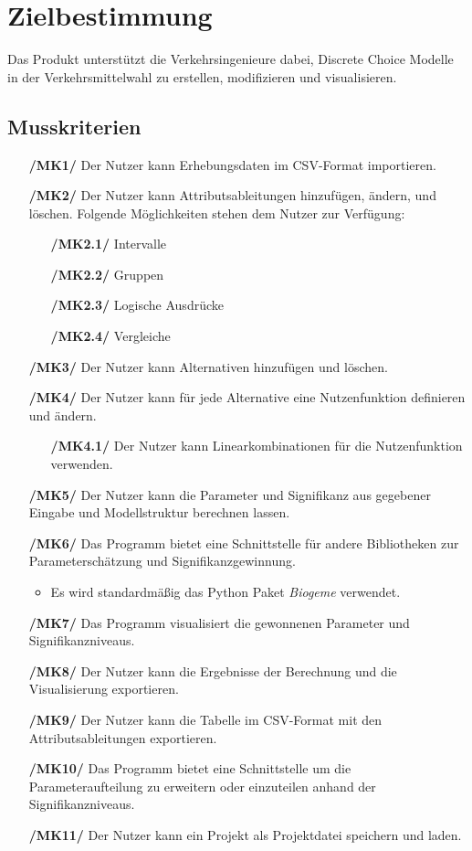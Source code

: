 \documentclass{article}
\begin{document}
\newpage
\section{Zielbestimmung}
Das Produkt unterstützt die Verkehrsingenieure dabei, Discrete Choice Modelle in der Verkehrsmittelwahl zu erstellen, modifizieren und visualisieren.
\subsection{Musskriterien}
\begin{itemize}
    \item[\textbf{/MK1/}] Der Nutzer kann Erhebungsdaten im CSV-Format importieren.
    \item[\textbf{/MK2/}] Der Nutzer kann Attributsableitungen hinzufügen, ändern, und löschen.
    \subitem Folgende Möglichkeiten stehen dem Nutzer zur Verfügung:
    \begin{itemize}[leftmargin=.7in]
        \item[\textbf{/MK2.1/}] Intervalle
        \item[\textbf{/MK2.2/}] Gruppen
        \item[\textbf{/MK2.3/}] Logische Ausdrücke
        \item[\textbf{/MK2.4/}] Vergleiche
    \end{itemize}
    \item[\textbf{/MK3/}] Der Nutzer kann Alternativen hinzufügen und löschen.
    \item[\textbf{/MK4/}] Der Nutzer kann für jede Alternative eine Nutzenfunktion definieren und ändern.
    \begin{itemize}[leftmargin=.7in]
        \item[\textbf{/MK4.1/}] Der Nutzer kann Linearkombinationen für die Nutzenfunktion verwenden.
    \end{itemize}
    \item[\textbf{/MK5/}] Der Nutzer kann die Parameter und Signifikanz aus gegebener Eingabe und Modellstruktur berechnen lassen.
    \item[\textbf{/MK6/}] Das Programm bietet eine Schnittstelle für andere Bibliotheken zur Parameterschätzung und Signifikanzgewinnung. 
    \begin{itemize}
        \item Es wird standardmäßig das Python Paket \textit{Biogeme} verwendet.
    \end{itemize}
    \item[\textbf{/MK7/}] Das Programm visualisiert die gewonnenen Parameter und Signifikanzniveaus.
    \item[\textbf{/MK8/}] Der Nutzer kann die Ergebnisse der Berechnung und die Visualisierung exportieren.
    \item[\textbf{/MK9/}] Der Nutzer kann die Tabelle im CSV-Format mit den Attributsableitungen exportieren.
    \item[\textbf{/MK10/}] Das Programm bietet eine Schnittstelle um die Parameteraufteilung zu erweitern oder einzuteilen anhand der Signifikanzniveaus.
    \item[\textbf{/MK11/}] Der Nutzer kann ein Projekt als Projektdatei speichern und laden.
\end{itemize}
\end{document}
